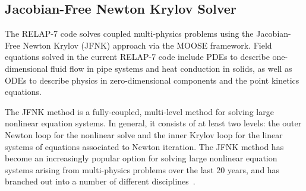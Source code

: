 \subsection{Jacobian-Free Newton Krylov Solver\label{sec:jfnk}}
%
The RELAP-7 code solves coupled multi-physics problems using the
Jacobian-Free Newton Krylov (JFNK) approach via the MOOSE
framework. Field equations solved in the current RELAP-7 code include
PDEs to describe one-dimensional fluid flow in pipe systems and heat
conduction in solids, as well as ODEs to describe physics in
zero-dimensional components and the point kinetics equations.

The JFNK method is a fully-coupled, multi-level method for solving large
nonlinear equation systems. In general, it consists of at least two
levels: the outer Newton loop for the nonlinear solve and the inner
Krylov loop for the linear systems of equations associated to Newton
iteration.  The JFNK method has become an increasingly popular option
for solving large nonlinear equation systems arising from
multi-physics problems over the last 20 years, and has branched out
into a number of different disciplines~\cite{Knoll_2004}.

